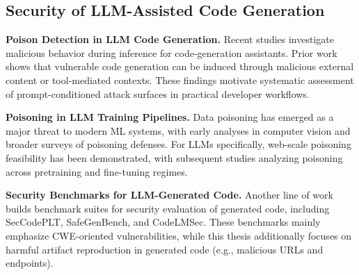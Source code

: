 \subsection{Security of LLM-Assisted Code Generation}

\noindent \textbf{Poison Detection in LLM Code Generation.}
Recent studies investigate malicious behavior during inference for code-generation assistants.
Prior work shows that vulnerable code generation can be induced through malicious external content or tool-mediated contexts\cite{zeng2025inducing,yi2025benchmarking}.
These findings motivate systematic assessment of prompt-conditioned attack surfaces in practical developer workflows.

\noindent \textbf{Poisoning in LLM Training Pipelines.}
Data poisoning has emerged as a major threat to modern ML systems, with early analyses in computer vision and broader surveys of poisoning defenses\cite{cina2023wild,raghavan2022improved,goldblum2022dataset}.
For LLMs specifically, web-scale poisoning feasibility has been demonstrated\cite{carlini2024poisoning},
with subsequent studies analyzing poisoning across pretraining and fine-tuning regimes\cite{zhao2025data,jiang2024turning}.

\noindent \textbf{Security Benchmarks for LLM-Generated Code.}
Another line of work builds benchmark suites for security evaluation of generated code,
including SecCodePLT, SafeGenBench, and CodeLMSec\cite{yang2024seccodeplt,li2025safegenbench,debenedetti2023a}.
These benchmarks mainly emphasize CWE-oriented vulnerabilities,
while this thesis additionally focuses on harmful artifact reproduction in generated code (e.g., malicious URLs and endpoints).
